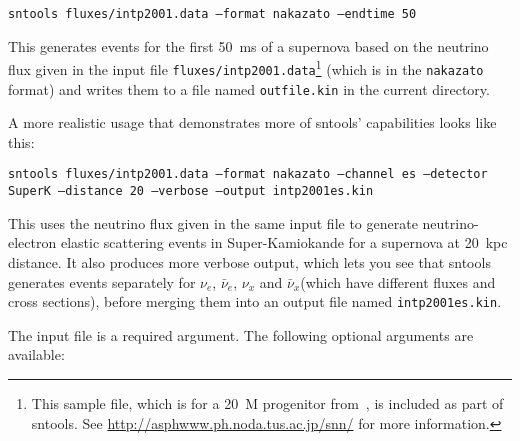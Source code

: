 \documentclass[11pt, oneside]{article}
\newcommand{\nue}{\ensuremath{\nu_e}\xspace}
\newcommand{\nux}{\ensuremath{\nu_x}\xspace}
\newcommand{\nuebar}{\ensuremath{\bar{\nu}_e}\xspace}
\newcommand{\nuxbar}{\ensuremath{\bar{\nu}_x}\xspace}
\begin{document}
\texttt{sntools fluxes/intp2001.data --format nakazato --endtime 50}

This generates events for the first \SI{50}{ms} of a supernova based on the neutrino flux given in the input file \texttt{fluxes/intp2001.data}\footnote{This sample file, which is for a \SI{20}{M_\odot} progenitor from~\cite{Nakazato2013}, is included as part of sntools. See \url{http://asphwww.ph.noda.tus.ac.jp/snn/} for more information.} (which is in the \texttt{nakazato} format) and writes them to a file named \texttt{outfile.kin} in the current directory.

A more realistic usage that demonstrates more of sntools’ capabilities looks like this:

\texttt{sntools fluxes/intp2001.data --format nakazato --channel es --detector SuperK --distance 20 --verbose --output intp2001es.kin}

This uses the neutrino flux given in the same input file to generate neutrino-electron elastic scattering events in Super-Kamiokande for a supernova at \SI{20}{kpc} distance.
It also produces more verbose output, which lets you see that sntools generates events separately for \nue, \nuebar, \nux and \nuxbar (which have different fluxes and cross sections), before merging them into an output file named \texttt{intp2001es.kin}.


The input file is a required argument. The following optional arguments are available:
\end{document}
